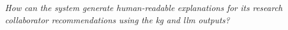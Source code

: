 \textit{How can the system generate human-readable explanations for its research collaborator recommendations using the \gls{kg} and \gls{llm} outputs?}
